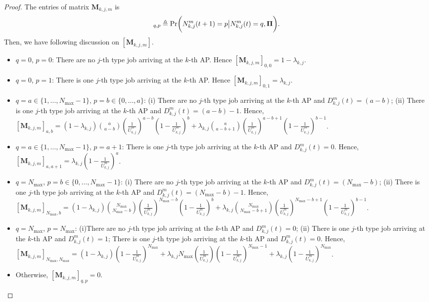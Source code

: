 \begin{proof}
    The entries of matrix $\mathbf{M}_{k,j,m}$ is
    \begin{align*}
        [\mathbf{M}_{k,j,m}]_{q,p}\define\Pr\Paren{ N_{k,j}^m(t+1)=p\big|N_{k,j}^m(t)=q,\Baseline }.
    \end{align*}
    Then, we have following discussion on $[\mathbf{M}_{k,j,m}]$.
    \begin{itemize}
        \item $q=0$, $p=0$: There are no $j$-th type job arriving at the $k$-th AP. Hence $[\mathbf{M}_{k,j,m}]_{0,0}=1-\lambda_{k,j}$.
        \item $q=0$, $p=1$: There is one $j$-th type job arriving at the $k$-th AP. Hence $[\mathbf{M}_{k,j,m}]_{0,1}=\lambda_{k,j}$.
        \item $q=a\in\{1,\dots,N_{{\max}}-1\}$, $p=b\in\{0,\dots,a\}$: (i)
        There are no $j$-th type job arriving at the $k$-th AP and $D_{k,j}^{m}(t)=(a-b)$; (ii) There is one $j$-th type job arriving at the $k$-th AP and $D_{k,j}^{m}(t)=(a-b)-1$.
        Hence,  $[\mathbf{M}_{k,j,m}]_{a,b}=(1-\lambda_{k,j})\binom{a}{a-b}(\frac{1}{\bar{U}_{k,j}^{m}})^{a-b}(1-\frac{1}{\bar{U}_{k,j}^{m}})^{b}+\lambda_{k,j}\binom{a}{a-b+1}(\frac{1}{\bar{U}_{k,j}^{m}})^{a-b+1}(1-\frac{1}{\bar{U}_{k,j}^{m}})^{b-1}$.
        \item $ q=a\in\{1,\dots,N_{{\max}}-1\}$, $p=a+1$: There is one $j$-th type job arriving at the $k$-th AP and  $D_{k,j}^{m}(t)=0$. Hence, $[\mathbf{M}_{k,j,m}]_{a,a+1}=\lambda_{k,j}(1-\frac{1}{\bar{U}_{k,j}^{m}})^{a}$.
        \item  $q=N_{\max}$, $p=b\in\{0,\dots,N_{\max}-1\}$: (i)
        There are no $j$-th type job arriving at the $k$-th AP and $D_{k,j}^{m}(t)=(N_{{\max}}-b)$; (ii) There is one $j$-th type job arriving at the $k$-th AP and $D_{k,j}^{m}(t)=(N_{{\max}}-b)-1$. Hence, $[\mathbf{M}_{k,j,m}]_{N_{{\max}},b}=(1-\lambda_{k,j})\binom{N_{\max}}{N_{\max}-b}(\frac{1}{\bar{U}_{k,j}^{m}})^{N_{\max}-b}(1-\frac{1}{\bar{U}_{k,j}^{m}})^{b}+\lambda_{k,j}\binom{N_{\max}}{N_{\max}-b+1}(\frac{1}{\bar{U}_{k,j}^{m}})^{N_{\max}-b+1}(1-\frac{1}{\bar{U}_{k,j}^{m}})^{b-1}$.
        \item  $q=N_{\max}$, $p=N_{\max}$: (i)There are no $j$-th type job arriving at the $k$-th AP and $D_{k,j}^{m}(t)=0$; (ii) There is one $j$-th type job arriving at the $k$-th AP and $D_{k,j}^{m}(t)=1$; There is one $j$-th type job arriving at the $k$-th AP and $D_{k,j}^{m}(t)=0$. Hence, $[\mathbf{M}_{k,j,m}]_{N_{{\max}},N_{{\max}}}=(1-\lambda_{k,j})(1-\frac{1}{\bar{U}_{k,j}^{m}})^{N_{\max}}+\lambda_{k,j}{N_{\max}}(\frac{1}{\bar{U}_{k,j}^{m}})(1-\frac{1}{\bar{U}_{k,j}^{m}})^{N_{\max}-1}+\lambda_{k,j}(1-\frac{1}{\bar{U}_{k,j}^{m}})^{N_{\max}}$.
        \item Otherwise, $[\mathbf{M}_{k,j,m}]_{q,p}=0$.
    \end{itemize}


\end{proof}
